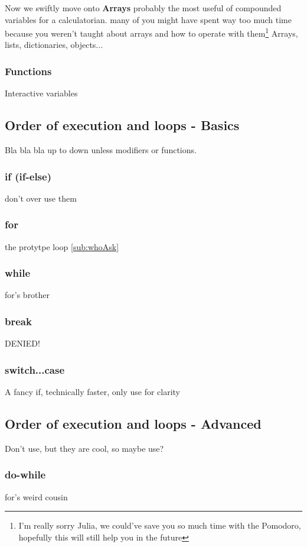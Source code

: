 Now we swiftly move onto \textbf{Arrays} probably the most useful of compounded variables for a calculatorian.
many of you might have spent way too much time because you weren't taught about arrays and how to operate with them\footnote{I'm really sorry Julia, we could've save you so much time with the Pomodoro, hopefully this will still help you in the future}
Arrays, lists, dictionaries, objects...
\subsubsection{Functions}
\label{subsub:functions}
Interactive variables

\subsection{Order of execution and loops - Basics}
\label{sub:execBasic}
Bla bla bla up to down unless modifiers or functions.
\subsubsection{if (if-else)}
\label{subsub:if}
don't over use them

\subsubsection{for}
\label{subsub:for}
the protytpe loop \ref{sub:whoAsk}

\subsubsection{while}
\label{sub:while}
for's brother

\subsubsection{break}
\label{subsub:break}
DENIED!

\subsubsection{switch...case}
\label{subsub:switch}
A fancy if, technically faster, only use for clarity

\subsection{Order of execution and loops - Advanced}
\label{sub:execAdv}
Don't use, but they are cool, so maybe use?
\subsubsection{do-while}
\label{subsub:doWhile}
for's weird cousin

